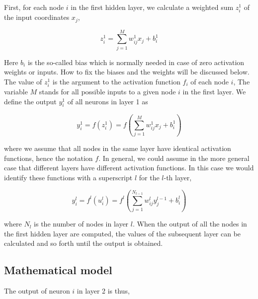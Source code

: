 \documentclass[11pt]{article}
\begin{document}
First, for each node \(i\) in the first hidden layer, we calculate a
weighted sum \(z_i^1\) of the input coordinates \(x_j\),

    \hypertarget{_auto1}{}

\[
\begin{equation} z_i^1 = \sum_{j=1}^{M} w_{ij}^1 x_j + b_i^1
\label{_auto1} \tag{2}
\end{equation}
\]

    Here \(b_i\) is the so-called bias which is normally needed in case of
zero activation weights or inputs. How to fix the biases and the weights
will be discussed below. The value of \(z_i^1\) is the argument to the
activation function \(f_i\) of each node \(i\), The variable \(M\)
stands for all possible inputs to a given node \(i\) in the first layer.
We define the output \(y_i^1\) of all neurons in layer 1 as

    \hypertarget{outputLayer1}{}

\[
\begin{equation}
 y_i^1 = f(z_i^1) = f\left(\sum_{j=1}^M w_{ij}^1 x_j  + b_i^1\right)
\label{outputLayer1} \tag{3}
\end{equation}
\]

    where we assume that all nodes in the same layer have identical
activation functions, hence the notation \(f\). In general, we could
assume in the more general case that different layers have different
activation functions. In this case we would identify these functions
with a superscript \(l\) for the \(l\)-th layer,

    \hypertarget{generalLayer}{}

\[
\begin{equation}
 y_i^l = f^l(u_i^l) = f^l\left(\sum_{j=1}^{N_{l-1}} w_{ij}^l y_j^{l-1} + b_i^l\right)
\label{generalLayer} \tag{4}
\end{equation}
\]

    where \(N_l\) is the number of nodes in layer \(l\). When the output of
all the nodes in the first hidden layer are computed, the values of the
subsequent layer can be calculated and so forth until the output is
obtained.

\hypertarget{mathematical-model}{%
\subsection{Mathematical model}\label{mathematical-model}}

The output of neuron \(i\) in layer 2 is thus,
\end{document}
